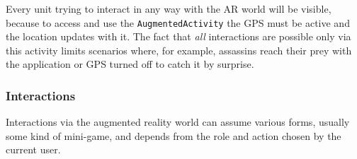 			Every unit trying to interact in any way with the AR world will be visible, because to access and use the \lstinline|AugmentedActivity| the GPS must be active and the location updates with it.
			The fact that \emph{all} interactions are possible only via this activity limits scenarios where, for example, assassins reach their prey with the application or GPS turned off to catch it by surprise.
			
			\subsubsection{Interactions}\label{focus:augmented:actions}
			
			Interactions via the augmented reality world can assume various forms, usually some kind of mini-game, and depends from the role and action chosen by the current user.
				
